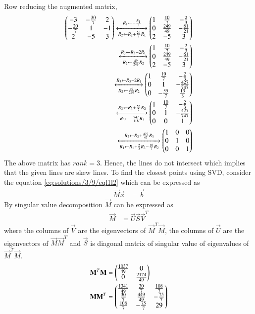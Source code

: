 Row reducing the augmented matrix, 
\begin{align}
	\begin{pmatrix}-3 & -\frac{30}{7} & 2\\ -\frac{20}{7} & 1 & -1\\ 2 & -5 & 3\end{pmatrix} \xleftrightarrow[R_2 \leftarrow R_2 + \frac{20}{7}R_1]{R_1 \leftarrow -\frac{R_1}{3}} \begin{pmatrix}1 & \frac{10}{7} & -\frac{2}{3}\\ 0 & \frac{249}{49} & -\frac{61}{21}\\ 2 & -5 & 3\end{pmatrix}\\
	\xleftrightarrow[R_2 \leftarrow \frac{49}{249}R_2]{R_3 \leftarrow R_3 - 2R_1} \begin{pmatrix}1 & \frac{10}{7} & -\frac{2}{3}\\ 0 & \frac{249}{49} & -\frac{61}{21}\\ 2 & -5 & 3\end{pmatrix}\\
	\xleftrightarrow[R_2 \leftarrow \frac{49}{249}R_2]{R_3 \leftarrow R_3 - 2R_1} \begin{pmatrix}1 & \frac{10}{7} & -\frac{2}{3}\\ 0 & 1 & -\frac{427}{747}\\ 0 & -\frac{55}{7} & \frac{13}{3}\end{pmatrix}\\
	\xleftrightarrow[R_3 \leftarrow -\frac{747}{118}R_3]{R_3 \leftarrow R_3 +\frac{55}{7}R_2} \begin{pmatrix}1 & \frac{10}{7} & -\frac{2}{3}\\ 0 & 1 & -\frac{427}{747}\\ 0 & 0& 1\end{pmatrix}\\
	\xleftrightarrow[R_1 \leftarrow R_1 + \frac{2}{3}R_3 - \frac{10}{7}R_2]{R_2 \leftarrow R_2 +\frac{427}{47}R_3} \begin{pmatrix}1 & 0 & 0\\ 0 & 1 & 0\\ 0 & 0& 1\end{pmatrix}
\end{align}
The above matrix has $rank = 3$. Hence, the lines do not intersect which implies that the given lines are skew lines. To find the closest points using SVD, consider the equation \eqref{eq:solutions/3/9/eql1l2} which can be expressed as 
\begin{align}
	\vec{M}\vec{x}&=\vec{b}\label{eq:solutions/3/9/mx=b}
\end{align}
By singular value decomposition $\vec{M}$
can be expressed as 
\begin{align}
	\vec{M}&=\vec{U}\vec{S}\vec{V}^T\label{eq:solutions/3/9/main}
\end{align}
where the columns of $\vec{V}$ are the eigenvectors of $\vec{M}^T\vec{M}$, the columns of $\vec{U}$ are the eigenvectors of $\vec{M}\vec{M}^T$ and $\vec{S}$ is diagonal matrix of singular value of eigenvalues of $\vec{M}^T\vec{M}$.
\begin{align}
	\mathbf{M}^T\mathbf{M} &=\begin{pmatrix}\frac{1037}{49} & 0\\ 0 & \frac{2174}{49}\end{pmatrix}\\
	\mathbf{M}\mathbf{M}^T &=\begin{pmatrix}\frac{1341}{49} & \frac{30}{7} & \frac{108}{7}\\ \frac{30}{7} & \frac{449}{49} & -\frac{75}{7} \\ \frac{108}{7} & -\frac{75}{7} & 29\end{pmatrix}
\end{align}
